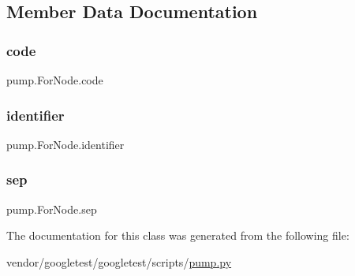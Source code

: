 \subsection{Member Data Documentation}
\mbox{\label{classpump_1_1_for_node_afdb5f4f2a3bc772bbc6ea777dfde898e}} 
\subsubsection{\texorpdfstring{code}{code}}
{\footnotesize\ttfamily pump.\+For\+Node.\+code}

\mbox{\label{classpump_1_1_for_node_a2444199e135e43696b3a006bd0d38982}} 
\subsubsection{\texorpdfstring{identifier}{identifier}}
{\footnotesize\ttfamily pump.\+For\+Node.\+identifier}

\mbox{\label{classpump_1_1_for_node_a06b493278b3c1ad53363a2bcc3b8efb3}} 
\subsubsection{\texorpdfstring{sep}{sep}}
{\footnotesize\ttfamily pump.\+For\+Node.\+sep}



The documentation for this class was generated from the following file\+:\begin{DoxyCompactItemize}
\item 
vendor/googletest/googletest/scripts/\hyperlink{pump_8py}{pump.\+py}\end{DoxyCompactItemize}

